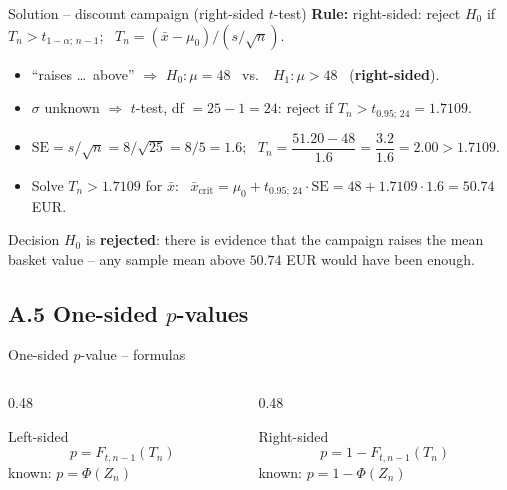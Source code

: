 \documentclass[aspectratio=169,11pt]{beamer}
\begin{document}
\begin{frame}{Solution -- discount campaign (right-sided $t$-test)}
  \textbf{Rule:} right-sided: reject $H_0$ if $T_n>t_{1-\alpha;\,n-1}$; \
  $T_n=(\bar x-\mu_0)/(s/\sqrt n)$.
  \begin{itemize}\setlength{\itemsep}{3pt}
    \item[a)] ``raises \ldots\ above'' $\Rightarrow$ $H_0:\mu=48$ \ vs.\ \
          $H_1:\mu>48$ \ (\textbf{right-sided}).
    \item[b)] $\sigma$ unknown $\Rightarrow$ $t$-test, df $=25-1=24$: reject if
          $T_n>t_{0.95;\,24}=\mathbf{1.7109}$.
    \item[c)] $\mathrm{SE}=s/\sqrt n=8/\sqrt{25}=8/5=1.6$; \
          $T_n=\dfrac{51.20-48}{1.6}=\dfrac{3.2}{1.6}=\mathbf{2.00}>1.7109$.
    \item[d)] Solve $T_n>1.7109$ for $\bar x$: \
          $\bar x_{\text{crit}}=\mu_0+t_{0.95;\,24}\cdot\mathrm{SE}
          =48+1.7109\cdot1.6=\mathbf{50.74}$ EUR.
  \end{itemize}
  \begin{alertblock}{Decision}
    $H_0$ is \textbf{rejected}: there is evidence that the campaign raises the
    mean basket value -- any sample mean above $50.74$ EUR would have been
    enough.
  \end{alertblock}
\end{frame}

\subsection{A.5 One-sided \texorpdfstring{$p$}{p}-values}

\begin{frame}{One-sided $p$-value -- formulas}
  \begin{columns}[T]
    \begin{column}{0.48\textwidth}
      \begin{block}{Left-sided}
        \[ p = F_{t,n-1}(T_n) \]
        \footnotesize known: $p=\Phi(Z_n)$
      \end{block}
    \end{column}
    \begin{column}{0.48\textwidth}
      \begin{block}{Right-sided}
        \[ p = 1 - F_{t,n-1}(T_n) \]
        \footnotesize known: $p=1-\Phi(Z_n)$
      \end{block}
    \end{column}
  \end{columns}
\end{frame}
\end{document}
